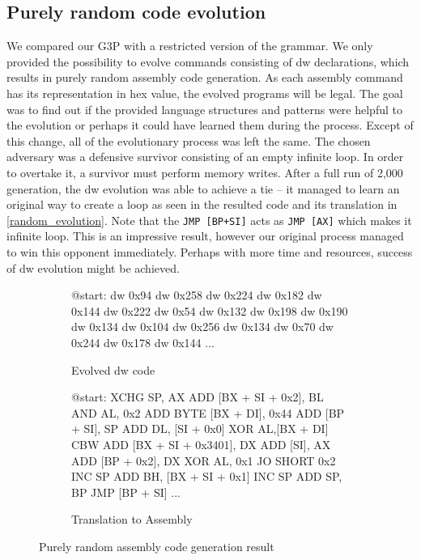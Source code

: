 \documentclass[dvipsnames,format=sigconf,anonymous=true,review=true]{acmart}
\begin{document}
\subsection{Purely random code evolution}
We compared our G3P with a restricted version of the grammar. We only provided the possibility to evolve commands consisting of dw declarations, which results in purely random assembly code generation. As each assembly command has its representation in hex value, the evolved programs will be legal. The goal was to find out if the provided language structures and patterns were helpful to the evolution or perhaps it could have learned them during the process. Except of this change, all of the evolutionary process was left the same. The chosen adversary was a defensive survivor consisting of an empty infinite loop. In order to overtake it, a survivor must perform memory writes. After a full run of 2,000 generation, the dw evolution was able to achieve a tie -- it managed to learn an original way to create a loop as seen in the resulted code and its translation in \autoref{random_evolution}. Note that the \texttt{JMP [BP+SI]} acts as \texttt{JMP [AX]} which makes it infinite loop. This is an impressive result, however our original process managed to win this opponent immediately. Perhaps with more time and resources, success of dw evolution might be achieved.

\begin{figure}
\centering
\begin{subfigure}[t]{0.48\textwidth}
    \begin{assembly}
    @start:
    dw 0x94
    dw 0x258
    dw 0x224
    dw 0x182
    dw 0x144
    dw 0x222
    dw 0x54
    dw 0x132
    dw 0x198
    dw 0x190
    dw 0x134
    dw 0x104
    dw 0x256
    dw 0x134
    dw 0x70
    dw 0x244
    dw 0x178
    dw 0x144
    ...
    \end{assembly}
    \caption{Evolved dw code}
\end{subfigure}
\hfill
\begin{subfigure}[t]{0.49\textwidth}
    \begin{assembly}
    @start:
    XCHG SP, AX
    ADD [BX + SI + 0x2], BL
    AND AL, 0x2
    ADD BYTE [BX + DI], 0x44
    ADD [BP + SI], SP
    ADD DL, [SI + 0x0]
    XOR AL,[BX + DI]
    CBW
    ADD [BX + SI + 0x3401], DX
    ADD [SI], AX
    ADD [BP + 0x2], DX
    XOR AL, 0x1
    JO SHORT 0x2
    INC SP
    ADD BH, [BX + SI + 0x1]
    INC SP
    ADD SP, BP
    JMP [BP + SI]
    ...
    \end{assembly}
    \caption{Translation to Assembly}
\end{subfigure}
\caption{Purely random assembly code generation result}
\label{random_evolution}
\end{figure}
\end{document}
